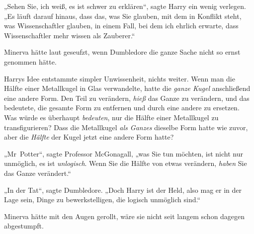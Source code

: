 „Sehen Sie, ich weiß, es ist schwer zu erklären“, sagte Harry ein wenig verlegen.
„Es läuft darauf hinaus, dass das, was Sie glauben, mit dem in Konflikt steht, was Wissenschaftler glauben, in einem Fall, bei dem ich ehrlich erwarte, dass Wissenschaftler mehr wissen als Zauberer.“

Minerva hätte laut geseufzt, wenn Dumbledore die ganze Sache nicht so ernst genommen hätte.

Harrys Idee entstammte simpler Unwissenheit, nichts weiter. Wenn man die Hälfte einer Metallkugel in Glas verwandelte, hatte die \emph{ganze Kugel} anschließend eine andere Form. Den Teil zu verändern, \emph{hieß} das Ganze zu verändern, und das bedeutete, die gesamte Form zu entfernen und durch eine andere zu ersetzen. Was würde es überhaupt \emph{bedeuten}, nur die Hälfte einer Metallkugel zu transfigurieren? Dass die Metallkugel \emph{als Ganzes} dieselbe Form hatte wie zuvor, aber die \emph{Hälfte} der Kugel jetzt eine andere Form hatte?

„Mr~Potter“, sagte Professor McGonagall, „was Sie tun möchten, ist nicht nur unmöglich, es ist \emph{unlogisch}. Wenn Sie die Hälfte von etwas verändern, \emph{haben} Sie das Ganze verändert.“

„In der Tat“, sagte Dumbledore.
„Doch Harry ist der Held, also mag er in der Lage sein, Dinge zu bewerkstelligen, die logisch unmöglich sind.“

Minerva hätte mit den Augen gerollt, wäre sie nicht seit langem schon dagegen abgestumpft.

